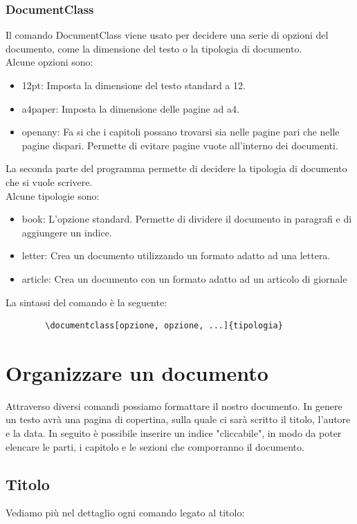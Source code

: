 \documentclass[12pt, oneside, openany, a4paper]{book}
\begin{document}
	\subsection{DocumentClass}
	Il comando DocumentClass viene usato per decidere una serie di opzioni del documento, come la dimensione del testo o la tipologia di documento.
	\\Alcune opzioni sono:
	\begin{itemize}
		\item 12pt: Imposta la dimensione del testo standard a 12.
		\item a4paper: Imposta la dimensione delle pagine ad a4.
		\item openany: Fa si che i capitoli possano trovarsi sia nelle pagine pari che nelle pagine dispari. Permette di evitare pagine vuote all'interno dei documenti.
	\end{itemize}
	La seconda parte del programma permette di decidere la tipologia di documento che si vuole scrivere.
	\\Alcune tipologie sono:
	\begin{itemize}
		\item book: L'opzione standard. Permette di dividere il documento in paragrafi e di aggiungere un indice.
		\item letter: Crea un documento utilizzando un formato adatto ad una lettera.
		\item article: Crea un documento con un formato adatto ad un articolo di giornale
	\end{itemize}
	La sintassi del comando è la seguente:
	\begin{lstlisting}
		\documentclass[opzione, opzione, ...]{tipologia}
	\end{lstlisting}
	
	
	
	\chapter{Organizzare un documento}
	Attraverso diversi comandi possiamo formattare il nostro documento. In genere un testo avrà una pagina di copertina, sulla quale ci sarà scritto il titolo, l'autore e la data. In seguito è possibile inserire un indice "cliccabile", in modo da poter elencare le parti, i capitolo e le sezioni che comporranno il documento.
	\section{Titolo}
	Vediamo più nel dettaglio ogni comando legato al titolo:
	
\end{document}
